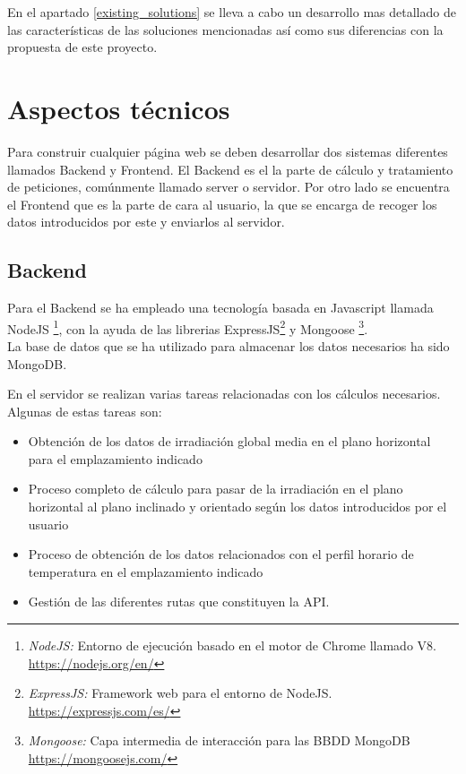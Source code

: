 En el apartado \ref{existing_solutions}  se lleva a cabo un desarrollo mas detallado de las características de las soluciones mencionadas así como sus diferencias con la propuesta de este proyecto.\\
\newpage

\section{Aspectos técnicos}

Para construir cualquier página web se deben desarrollar dos sistemas diferentes llamados Backend y Frontend.
El Backend es el la parte de cálculo y tratamiento de peticiones, comúnmente llamado server o servidor. Por otro lado se encuentra el Frontend que es la parte de cara al usuario, la que se encarga de recoger los datos introducidos por este y enviarlos al servidor.

\subsection{Backend}

Para el Backend se ha empleado una tecnología basada en Javascript llamada NodeJS \footnote{\textit{NodeJS:} Entorno de ejecución basado en el motor de Chrome llamado V8. \url{https://nodejs.org/en/} }, con la ayuda de las librerias ExpressJS\footnote{\textit{ExpressJS:} Framework web para el entorno de NodeJS. \url{https://expressjs.com/es/}} y Mongoose \footnote{\textit{Mongoose:} Capa intermedia de interacción para las BBDD MongoDB \url{https://mongoosejs.com/}}.   \\
La base de datos que se ha utilizado para almacenar los datos necesarios ha sido MongoDB.

En el servidor se realizan varias tareas relacionadas con los cálculos necesarios. Algunas de estas tareas son:
\begin{itemize}
\item Obtención de los datos de irradiación global media en el plano horizontal para el emplazamiento indicado
\item Proceso completo de cálculo para pasar de la irradiación en el plano horizontal al plano inclinado y orientado según los datos introducidos por el usuario
\item Proceso de obtención de los datos relacionados con el perfil horario de temperatura en el emplazamiento indicado
\item Gestión de las diferentes rutas que constituyen la API.
\end{itemize}

